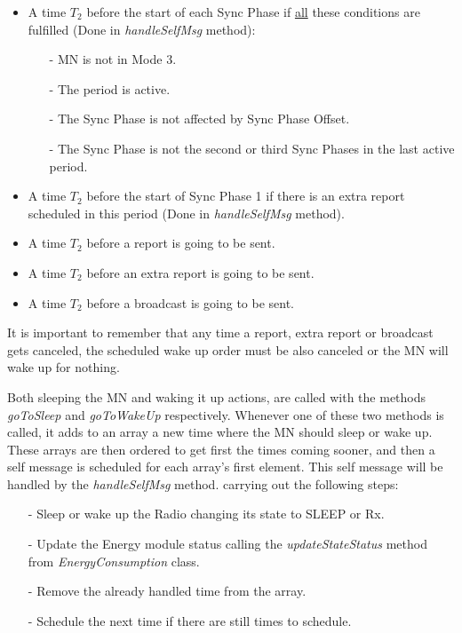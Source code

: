\begin{itemize}
  \item A time $T_2$ before the start of each Sync Phase if \underline{all} these conditions are fulfilled (Done in \textit{handleSelfMsg} method):
    \begin{itemize}
      \item[-] \ac{MN} is not in Mode 3.
      \item[-] The period is active.
      \item[-] The Sync Phase is not affected by Sync Phase Offset.
      \item[-] The Sync Phase is not the second or third Sync Phases in the last active period.
    \end{itemize}
  
  \item A time $T_2$ before the start of Sync Phase 1 if there is an extra report scheduled in this period (Done in \textit{handleSelfMsg} method).
  
  \item A time $T_2$ before a report is going to be sent.

  \item A time $T_2$ before an extra report is going to be sent.

  \item A time $T_2$ before a broadcast is going to be sent.
\end{itemize}

It is important to remember that any time a report, extra report or broadcast gets canceled, the scheduled wake up order must be also canceled 
or the \ac{MN} will wake up for nothing.

Both sleeping the \ac{MN} and waking it up actions, are called with the methods \textit{goToSleep} and \textit{goToWakeUp} respectively. Whenever
one of these two methods is called, it adds to an array a new time where the \ac{MN} should sleep or wake up. These arrays are then ordered to get
first the times coming sooner, and then a self message is scheduled for each array's first element. This self message will be handled by the 
\textit{handleSelfMsg} method. carrying out the following steps:
\begin{itemize}
 \item[-] Sleep or wake up the Radio changing its state to SLEEP or \ac{Rx}.
 
 \item[-] Update the Energy module status calling the \textit{updateStateStatus} method from \textit{EnergyConsumption} class.

 \item[-] Remove the already handled time from the array.

 \item[-] Schedule the next time if there are still times to schedule.
\end{itemize}



